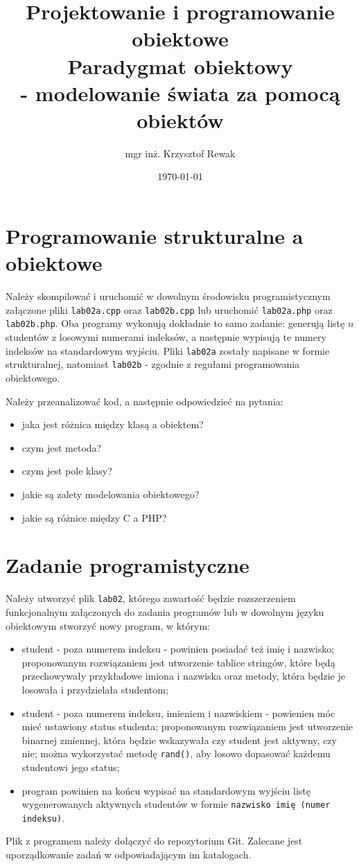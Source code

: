 \documentclass{article}
\title{
	Projektowanie i programowanie obiektowe \\
	\Huge{Paradygmat obiektowy \\ - modelowanie świata za pomocą obiektów}
}
\author{mgr inż. Krzysztof Rewak}
\date{\today}
\begin{document}
	\maketitle

	\section{Programowanie strukturalne a obiektowe}
	Należy skompilować i uruchomić w dowolnym środowisku programistycznym załączone pliki \texttt{lab02a.cpp} oraz \texttt{lab02b.cpp} lub uruchomić \texttt{lab02a.php} oraz \texttt{lab02b.php}. Oba programy wykonują dokładnie to samo zadanie: generują listę $n$ studentów z losowymi numerami indeksów, a następnie wypisują te numery indeksów na standardowym wyjściu. Pliki \texttt{lab02a} zostały napisane w formie strukturalnej, natomiast \texttt{lab02b} - zgodnie z regułami programowania obiektowego.
	
	Należy przeanalizować kod, a następnie odpowiedzieć na pytania:
	\begin{itemize}
		\item jaka jest różnica między klasą a obiektem?
		\item czym jest metoda?
		\item czym jest pole klasy?
		\item jakie są zalety modelowania obiektowego?
		\item jakie są różnice między C a PHP?
	\end{itemize}
	
	\section{Zadanie programistyczne}
	Należy utworzyć plik \texttt{lab02}, którego zawartość będzie rozszerzeniem funkcjonalnym załączonych do zadania programów lub w dowolnym języku obiektowym stworzyć nowy program, w którym:
	\begin{itemize}
		\item student - poza numerem indeksu - powinien posiadać też imię i nazwisko; proponowanym rozwiązaniem jest utworzenie tablice stringów, które będą przechowywały przykładowe imiona i nazwiska oraz metody, która będzie je losowała i przydzielała studentom;
		\item student - poza numerem indeksu, imieniem i nazwiskiem - powienien móc mieć ustawiony status studenta; proponowanym rozwiązaniem jest utworzenie binarnej zmiennej, która będzie wskazywała czy student jest aktywny, czy nie; można wykorzystać metodę \texttt{rand()}, aby losowo dopasować każdemu studentowi jego status;
		\item program powinien na końcu wypisać na standardowym wyjściu listę wygenerowanych aktywnych studentów w formie \texttt{nazwisko imię (numer indeksu)}.
	\end{itemize}
	
	Plik z programem należy dołączyć do repozytorium Git. Zalecane jest uporządkowanie zadań w odpowiadającym im katalogach. 
\end{document}
